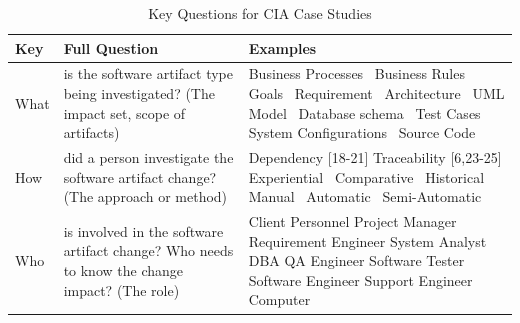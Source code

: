 \documentclass[conference]{IEEEtran}
\begin{document}
\begin{table}
\centering
\caption{Key Questions for CIA Case Studies}
\label{table:keyquestions}
\begin{tabular}{ | l @{} p{3.5cm} | p{3.5cm}|  } 
\hline
\rowcolor{lightgray} \textbf{Key}  & \textbf{Full Question} & \textbf{Examples}\\ 
\hline
What & is the software artifact type being investigated? 
\newline (The impact set, scope of artifacts) & Business Processes~\cite{mehboob2013approach} 
\newline Business Rules~\cite{oliveira2010change} 
\newline Goals~\cite{teka2012change} 
\newline Requirement~\cite{li2008requirement, nurmuliani2006requirements, davis1990software} 
\newline Architecture~\cite{tang2007using, mehboob2009approach} 
\newline UML Model~\cite{muller2014model} 
\newline Database schema~\cite{maule2008impact} 
\newline Test Cases~\cite{jainae2014tool, evans2007differential}  
\newline System Configurations~\cite{qu2011impact}  
\newline Source Code~\cite{li2013survey} 
\\ 

\hline
How & did a person investigate the software artifact change? 
\newline (The approach or method) 
& Dependency   [18-21]
\newline Traceability [6,23-25]
\newline Experiential~\cite{kilpinen2008emergence} 
\newline Comparative~\cite{evans2007differential} 
\newline Historical  
\newline Manual~\cite{wetzlmaier2015improving, kilpinen2008emergence} 
\newline Automatic~\cite{von2003quatrace,briand2002automating} 
\newline Semi-Automatic~\cite{barros1995supporting} 
\\ 

\hline
Who & is involved in the software artifact change? Who needs to know the change impact?
\newline (The role) & Client Personnel 
\newline Project Manager 
\newline Requirement Engineer 
\newline System Analyst 
\newline DBA 
\newline QA Engineer 
\newline Software Tester 
\newline Software Engineer 
\newline Support Engineer 
\newline Computer 
\\


\end{tabular}
\end{table}
\end{document}
